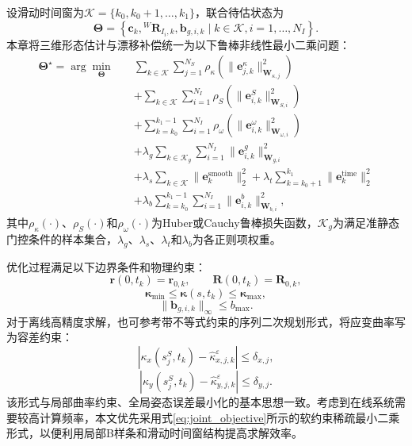 设滑动时间窗为$\mathcal K=\{k_0,k_0+1,\ldots,k_1\}$，联合待估状态为
\begin{equation}
    \bm\Theta=
    \left\{
    \bm c_k,
    {}^{W}\bm R_{I_i,k},
    \bm b_{g,i,k}
    \mid
    k\in\mathcal K,
    i=1,\ldots,N_I
    \right\}.
\end{equation}
本章将三维形态估计与漂移补偿统一为以下鲁棒非线性最小二乘问题：
\begin{align}
    \bm\Theta^{\star}
    =\arg\min_{\bm\Theta}\quad
    &\sum_{k\in\mathcal K}\sum_{j=1}^{N_S}
    \rho_{\kappa}\left(
    \|\bm e_{j,k}^{\kappa}\|_{\bm W_{\kappa,j}}^{2}
    \right)
    \nonumber\\
    &+\sum_{k\in\mathcal K}\sum_{i=1}^{N_I}
    \rho_{S}\left(
    \|\bm e_{i,k}^{S}\|_{\bm W_{S,i}}^{2}
    \right)
    \nonumber\\
    &+\sum_{k=k_0}^{k_1-1}\sum_{i=1}^{N_I}
    \rho_{\omega}\left(
    \|\bm e_{i,k}^{\omega}\|_{\bm W_{\omega,i}}^{2}
    \right)
    \nonumber\\
    &+\lambda_g
    \sum_{k\in\mathcal K_g}\sum_{i=1}^{N_I}
    \|\bm e_{i,k}^{g}\|_{\bm W_{g,i}}^{2}
    \nonumber\\
    &+\lambda_s\sum_{k\in\mathcal K}
    \|\bm e_{k}^{\mathrm{smooth}}\|_2^2
    +\lambda_t\sum_{k=k_0+1}^{k_1}
    \|\bm e_{k}^{\mathrm{time}}\|_2^2
    \nonumber\\
    &+\lambda_b\sum_{k=k_0}^{k_1-1}\sum_{i=1}^{N_I}
    \|\bm e_{i,k}^{b}\|_{\bm W_{b,i}}^2,
    \label{eq:joint_objective}
\end{align}
其中$\rho_{\kappa}(\cdot)$、$\rho_S(\cdot)$和$\rho_{\omega}(\cdot)$为Huber或Cauchy鲁棒损失函数，$\mathcal K_g$为满足准静态门控条件的样本集合，$\lambda_g$、$\lambda_s$、$\lambda_t$和$\lambda_b$为各正则项权重。

优化过程满足以下边界条件和物理约束：
\begin{equation}
    \bm r(0,t_k)=\bm r_{0,k},
    \qquad
    \bm R(0,t_k)=\bm R_{0,k},
    \label{eq:base_boundary}
\end{equation}
\begin{equation}
    \bm\kappa_{\min}
    \leq \bm\kappa(s,t_k)
    \leq \bm\kappa_{\max},
    \label{eq:curvature_bounds}
\end{equation}
\begin{equation}
    \|\bm b_{g,i,k}\|_{\infty}
    \leq b_{\max}.
    \label{eq:bias_bounds}
\end{equation}
对于离线高精度求解，也可参考带不等式约束的序列二次规划形式，将应变曲率写为容差约束：
\begin{equation}
    \left|
    \kappa_x(s_j^S,t_k)-\hat\kappa_{x,j,k}^{\varepsilon}
    \right|
    \leq \delta_{x,j},
\end{equation}
\begin{equation}
    \left|
    \kappa_y(s_j^S,t_k)-\hat\kappa_{y,j,k}^{\varepsilon}
    \right|
    \leq \delta_{y,j}.
\end{equation}
该形式与局部曲率约束、全局姿态误差最小化的基本思想一致\cite{an2024shape}。考虑到在线系统需要较高计算频率，本文优先采用式\eqref{eq:joint_objective}所示的软约束稀疏最小二乘形式，以便利用局部B样条和滑动时间窗结构提高求解效率。

